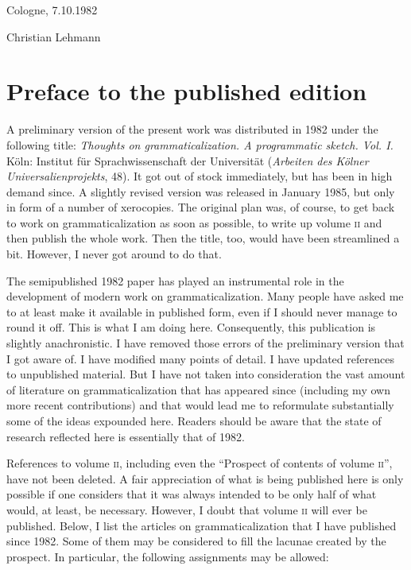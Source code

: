 \begin{refsection}
\vspace{\baselineskip}

\begin{minipage}{.45\linewidth}
\begin{flushleft}
Cologne, 7.10.1982
\end{flushleft}
\end{minipage}
\begin{minipage}{.45\linewidth}
\begin{flushright}
Christian Lehmann
\end{flushright}
\end{minipage}


\section*{Preface to the published edition}

A preliminary version of the present work was distributed in 1982 under the following title: \textit{Thoughts on grammaticalization. A programmatic sketch. Vol. I.} Köln: Institut für Sprachwissenschaft der Universität (\textit{Arbeiten des Kölner Universalienprojekts}, 48). It got out of stock immediately, but has been in high demand since. A slightly revised version was released in January 1985, but only in form of a number of xerocopies. The original plan was, of course, to get back to work on grammaticalization as soon as possible, to write up volume \textsc{ii} and then publish the whole work. Then the title, too, would have been streamlined a bit. However, I never got around to do that.

The semipublished 1982 paper has played an instrumental role in the development of modern work on grammaticalization. Many people have asked me to at least make it available in published form, even if I should never manage to round it off. This is what I am doing here. Consequently, this publication is slightly anachronistic. I have removed those errors of the preliminary version that I got aware of. I have modified many points of detail. I have updated references to unpublished material. But I have not taken into consideration the vast amount of literature on grammaticalization that has appeared since (including my own more recent contributions) and that would lead me to reformulate substantially some of the ideas expounded here. Readers should be aware that the state of research reflected here is essentially that of 1982.

References to volume \textsc{ii}, including even the ``Prospect of contents of volume \textsc{ii}'', have not been deleted. A fair appreciation of what is being published here is only possible if one considers that it was always intended to be only half of what would, at least, be necessary. However, I doubt that volume \textsc{ii} will ever be published. Below, I list the articles on grammaticalization that I have published since 1982. Some of them may be considered to fill the lacunae created by the prospect. In particular, the following assignments may be allowed:


\end{refsection}
